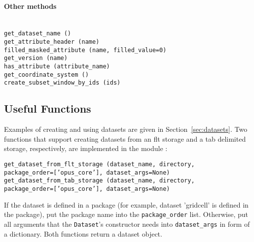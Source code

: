\paragraph{Other methods}~\\[1mm]
{\tt get_dataset_name ()}  \\
{\tt get_attribute_header (name)}  \\
{\tt filled_masked_attribute (name, filled_value=0)}  \\
{\tt get_version (name)}  \\
{\tt has_attribute (attribute_name)}  \\
{\tt get_coordinate_system ()}\\
{\tt create_subset_window_by_ids (ids)}

\subsection{Useful Functions}
%
Examples of creating and using datasets are given in Section~\ref{sec:datasets}. Two functions
that support creating datasets from an flt storage and a tab delimited storage, respectively, are implemented in 
the module :

{\tt get_dataset_from_flt_storage (dataset_name, directory, }\\
\hspace*{3cm} {\tt package_order=['opus_core'], dataset_args=None)}\\
{\tt get_dataset_from_tab_storage (dataset_name, directory, }\\
\hspace*{3cm} {\tt package_order=['opus_core'], dataset_args=None)}

If the dataset is defined in a package (for example, dataset 'gridcell' is defined
in the  package), put the package name into the {\tt package_order} list. 
Otherwise, put all arguments that the {\tt Dataset}'s constructor needs into 
{\tt dataset_args} in form of a dictionary. Both functions return a dataset object.
